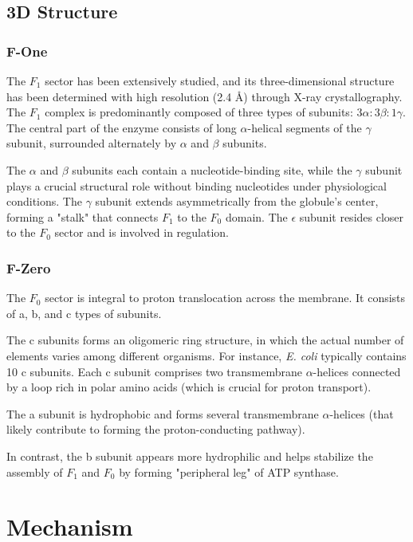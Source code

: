 \documentclass{article}
\begin{document}
\subsection{3D Structure}

\subsubsection{F-One}

The \textit{$F_1$} sector has been extensively studied, and its three-dimensional structure has been determined with high resolution (2.4 Å) through X-ray crystallography. The \textit{$F_1$} complex is predominantly composed of three types of subunits: $3\alpha : 3\beta : 1\gamma$. The central part of the enzyme consists of long $\alpha$-helical segments of the $\gamma$ subunit, surrounded alternately by $\alpha$ and $\beta$ subunits.

The $\alpha$ and $\beta$ subunits each contain a nucleotide-binding site, while the $\gamma$ subunit plays a crucial structural role without binding nucleotides under physiological conditions. The $\gamma$ subunit extends asymmetrically from the globule's center, forming a "stalk" that connects \textit{$F_1$} to the \textit{$F_0$} domain. The $\epsilon$ subunit resides closer to the \textit{$F_0$} sector and is involved in regulation.

\subsubsection{F-Zero}

The \textit{$F_0$} sector is integral to proton translocation across the membrane. It consists of a, b, and c types of subunits.

The c subunits forms an oligomeric ring structure, in which the actual number of elements varies among different organisms. For instance, \textit{E. coli} typically contains 10 c subunits. Each c subunit comprises two transmembrane $\alpha$-helices connected by a loop rich in polar amino acids (which is crucial for proton transport).

The a subunit is hydrophobic and forms several transmembrane $\alpha$-helices (that likely contribute to forming the proton-conducting pathway).

In contrast, the b subunit appears more hydrophilic and helps stabilize the assembly of \textit{$F_1$} and \textit{$F_0$} by forming "peripheral leg" of ATP synthase.

\section{Mechanism}
\end{document}
